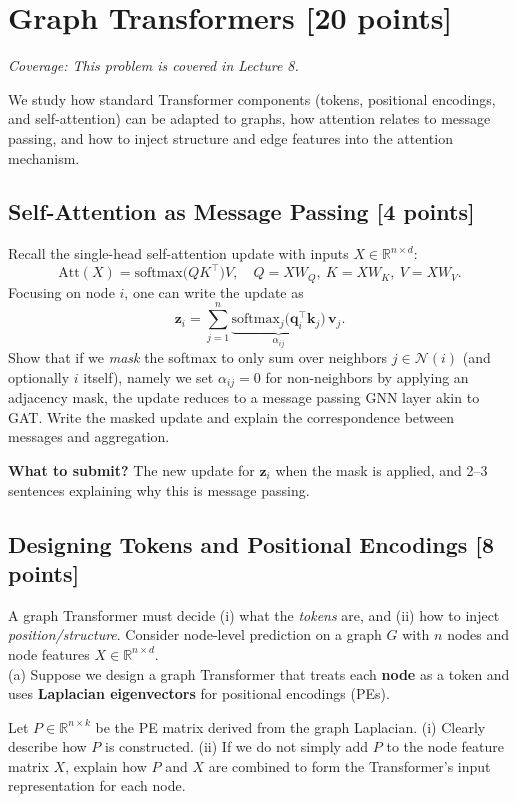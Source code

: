 \section{Graph Transformers [20 points]}
\noindent\textit{Coverage: This problem is covered in Lecture 8.}

We study how standard Transformer components (tokens, positional encodings, and self-attention) can be adapted to graphs, how attention relates to message passing, and how to inject structure and edge features into the attention mechanism.

\subsection{Self-Attention as Message Passing [4 points]}
Recall the single-head self-attention update with inputs $X\!\in\!\mathbb{R}^{n\times d}$:
\[
\mathrm{Att}(X)=\mathrm{softmax}\!\big(QK^\top\big)V,\quad
Q=XW_Q,\ K=XW_K,\ V=XW_V.
\]
Focusing on node $i$, one can write the update as
\[
\mathbf{z}_i=\sum_{j=1}^{n}\underbrace{\mathrm{softmax}_j\big(\mathbf{q}_i^\top\mathbf{k}_j\big)}_{\alpha_{ij}}\,\mathbf{v}_j.
\]
Show that if we \emph{mask} the softmax to only sum over neighbors $j\in\mathcal{N}(i)$ (and optionally $i$ itself), namely we set $\alpha_{ij}=0$ for non-neighbors by applying an adjacency mask, the update reduces to a message passing GNN layer akin to GAT. Write the masked update and explain the correspondence between messages and aggregation.

\textbf{What to submit?} The new update for $\mathbf{z}_i$ when the mask is applied, and 2--3 sentences explaining why this is message passing.

\Solution{
}

\subsection{Designing Tokens and Positional Encodings [8 points]}
A graph Transformer must decide (i) what the \emph{tokens} are, and (ii) how to inject \emph{position/structure}. Consider node-level prediction on a graph $G$ with $n$ nodes and node features $X\in\mathbb{R}^{n \times d}$.\\

(a) Suppose we design a graph Transformer that treats each \textbf{node} as a token and uses \textbf{Laplacian eigenvectors} for positional encodings (PEs). 

Let $P \in \mathbb{R}^{n \times k}$ be the PE matrix derived from the graph Laplacian. 
(i) Clearly describe how $P$ is constructed.  
(ii) If we do not simply add $P$ to the node feature matrix $X$, explain how $P$ and $X$ are combined to form the Transformer’s input representation for each node. 

